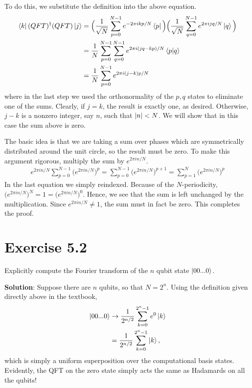 \documentclass{book}
\begin{document}
    To do this, we substitute the definition into the above equation. 
    \begin{align} \label{eq:5.1:expand_and_simplify}
    \begin{aligned}
        \bra{k}(QFT)^\dagger(QFT)\ket{j} &= \Big(\frac{1}{\sqrt{N}}\sum_{p=0}^{N-1}e^{-2\pi ikp/N}\bra{p}\Big)\Big(\frac{1}{\sqrt{N}}\sum_{q=0}^{N-1}e^{2\pi ijq/N}\ket{q}\Big) \\
        &= \frac{1}{N}\sum_{p=0}^{N-1}\sum_{q=0}^{N-1}e^{2\pi i(jq-kp)/N}\braket{p}{q} \\
        &= \frac{1}{N}\sum_{p=0}^{N-1} e^{2\pi i (j-k)p/N}
    \end{aligned}
    \end{align}
    where in the last step we used the orthonormality of the $p,q$ states to eliminate one of the sums. Clearly, if $j=k$, the result is exactly one, as desired. Otherwise, $j-k$ is a nonzero integer, say $n$, such that $\abs{n}<N$. We will show that in this case the sum above is zero. 
    
    The basic idea is that we are taking a sum over phases which are symmetrically distributed around the unit circle, so the result must be zero. To make this argument rigorous, multiply the sum by $e^{2\pi i n/N}$.
    \begin{align}
        e^{2\pi i n/N}\sum_{p=0}^{N-1}\big(e^{2\pi i n/N}\big)^p = \sum_{p=0}^{N-1}\big(e^{2\pi i n/N}\big)^{p+1} = \sum_{p=1}^{N}\big(e^{2\pi i n/N}\big)^{p}
    \end{align}
    In the last equation we simply reindexed. Because of the $N$-periodicity, $\big(e^{2\pi i n/N}\big)^N = 1 = \big(e^{2\pi i n/N}\big)^0$. Hence, we see that the sum is left unchanged by the multiplication. Since $e^{2\pi i n/N} \neq 1$, the sum must in fact be zero. This completes the proof.

\section*{Exercise 5.2}
    Explicitly compute the Fourier transform of the $n$ qubit state $\ket{00...0}$.
    
    \textbf{Solution}: Suppose there are $n$ qubits, so that $N=2^n$. Using the definition given directly above in the textbook,
    \begin{align}
        \ket{00...0} &\rightarrow \frac{1}{2^{n/2}} \sum_{k=0}^{2^n-1}e^0 \ket{k} \\
        &= \frac{1}{2^{n/2}}\sum_{k=0}^{2^n-1}\ket{k},
    \end{align}
    which is simply a uniform superposition over the computational basis states. Evidently, the QFT on the zero state simply acts the same as Hadamards on all the qubits!
    
\end{document}
